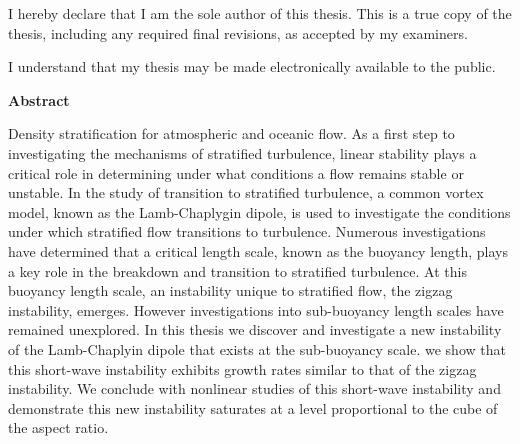 \cleardoublepage %
 


  \noindent
I hereby declare that I am the sole author of this thesis. This is a true copy of the thesis, including any required final revisions, as accepted by my examiners.

  \bigskip
  
  \noindent
I understand that my thesis may be made electronically available to the public.

\cleardoublepage


\begin{center}\textbf{Abstract}\end{center}
Density stratification  for atmospheric and oceanic flow. As a first step to investigating the mechanisms of stratified turbulence, linear stability plays a critical role in determining under what conditions a flow remains stable or unstable. In the study of transition to stratified turbulence, a common vortex model, known as the Lamb-Chaplygin dipole, is used to investigate the conditions under which stratified flow transitions to turbulence. Numerous investigations have determined that a critical length scale, known as the buoyancy length, plays a key role in the breakdown and transition to stratified turbulence. At this buoyancy length scale, an instability unique to stratified flow, the zigzag instability, emerges. However investigations into sub-buoyancy length scales have remained unexplored. In this thesis we discover and investigate a new instability of the Lamb-Chaplyin dipole that exists at the sub-buoyancy scale.  we show that this short-wave instability exhibits growth rates similar to that of the zigzag instability. We conclude with nonlinear studies of this short-wave instability and demonstrate this new instability saturates at a level proportional to the cube of the aspect ratio. 
\cleardoublepage

